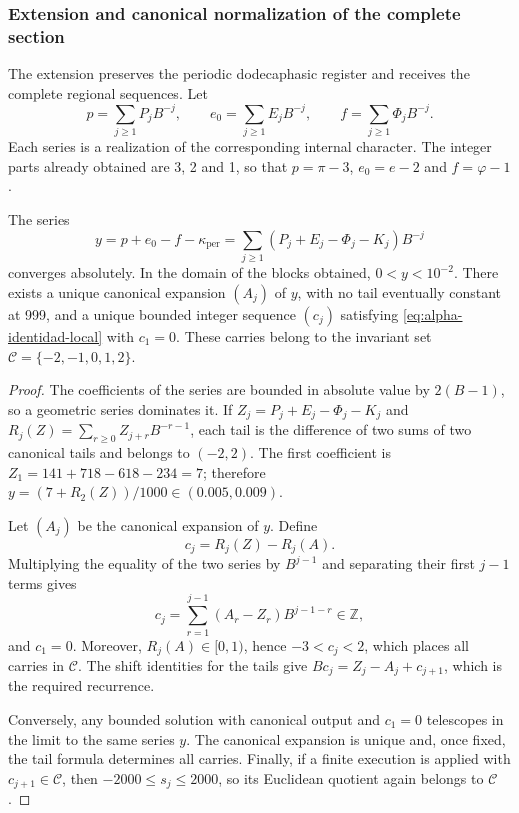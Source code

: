 \subsubsection{Extension and canonical normalization of the complete section}
\label{subsec:alpha-completa}

The extension preserves the periodic dodecaphasic register and receives the complete regional
sequences. Let
\[
 p=\sum_{j\geq1}P_jB^{-j},\qquad
 e_0=\sum_{j\geq1}E_jB^{-j},\qquad
 f=\sum_{j\geq1}\Phi_jB^{-j}.
\]
Each series is a realization of the corresponding internal character.
The integer parts already obtained are 3, 2 and 1, so that
\(p=\pi-3\), \(e_0=e-2\) and
\(f=\varphi-1\).

\begin{proposition}
\label{prop:alpha-normalizacion}
The series
\begin{equation}
 y=p+e_0-f-\kappa_{\mathrm{per}}
   =\sum_{j\geq1}(P_j+E_j-\Phi_j-K_j)B^{-j}
 \label{eq:alpha-serie}
\end{equation}
converges absolutely. In the domain of the blocks obtained,
\(0<y<10^{-2}\). There exists a unique canonical expansion \((A_j)\) of
\(y\), with no tail eventually constant at 999, and a unique bounded integer
sequence \((c_j)\) satisfying \eqref{eq:alpha-identidad-local} with
\(c_1=0\). These carries belong to the invariant set
\(\mathcal C=\{-2,-1,0,1,2\}\).
\end{proposition}

\begin{proof}
The coefficients of the series are bounded in absolute value by \(2(B-1)\),
so a geometric series dominates it. If
\(Z_j=P_j+E_j-\Phi_j-K_j\) and
\(R_j(Z)=\sum_{r\geq0}Z_{j+r}B^{-r-1}\), each tail is the difference
of two sums of two canonical tails and belongs to \((-2,2)\).
The first coefficient is
\(Z_1=141+718-618-234=7\); therefore
\(y=(7+R_2(Z))/1000\in(0.005,0.009)\).

Let \((A_j)\) be the canonical expansion of \(y\). Define
\[
 c_j=R_j(Z)-R_j(A).
\]
Multiplying the equality of the two series by \(B^{j-1}\) and separating
their first \(j-1\) terms gives
\[
 c_j=\sum_{r=1}^{j-1}(A_r-Z_r)B^{j-1-r}\in\mathbb Z,
\]
and \(c_1=0\). Moreover, \(R_j(A)\in[0,1)\), hence
\(-3<c_j<2\), which places all carries in \(\mathcal C\).
The shift identities for the tails give
\(Bc_j=Z_j-A_j+c_{j+1}\), which is the required recurrence.

Conversely, any bounded solution with canonical output and
\(c_1=0\) telescopes in the limit to the same series \(y\). The canonical
expansion is unique and, once fixed, the tail formula determines
all carries. Finally, if a finite execution is applied with
\(c_{j+1}\in\mathcal C\), then \(-2000\leq s_j\leq2000\),
so its Euclidean quotient again belongs to \(\mathcal C\).
\end{proof}

